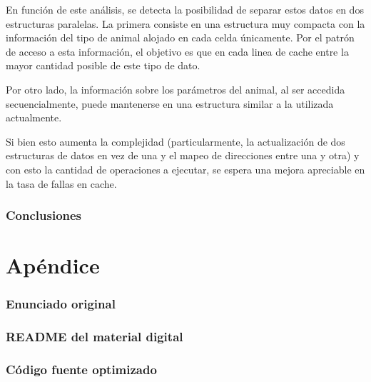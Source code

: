 \documentclass[a4paper,11pt]{article}
\begin{document}
En función de este análisis, se detecta la posibilidad de separar estos datos
en dos estructuras paralelas. La primera consiste en una estructura muy
compacta con la información del tipo de animal alojado en cada celda
únicamente. Por el patrón de acceso a esta información, el objetivo es que en
cada linea de cache entre la mayor cantidad posible de este tipo de dato.

Por otro lado, la información sobre los parámetros del animal, al ser accedida
secuencialmente, puede mantenerse en una estructura similar a la
utilizada actualmente.

Si bien esto aumenta la complejidad (particularmente, la actualización de dos
estructuras de datos en vez de una y el mapeo de direcciones entre una y otra)
y con esto la cantidad de operaciones a ejecutar, se espera una mejora
apreciable en la tasa de fallas en cache.

\section{Conclusiones}


\clearpage

\part{Apéndice}
\appendix

\section{Enunciado original}\label{sec:enunciado}


\clearpage
\section{README del material digital}\label{sec:readme}


\clearpage
\section{Código fuente optimizado}\label{sec:source}
\clearpage
{}


\end{document}
